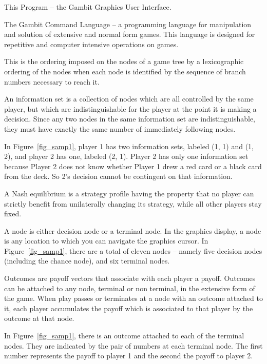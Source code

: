\begin{helpglossary}
\label{guigloss}
This Program -- the Gambit Graphics User Interface.

\label{gclgloss}
The Gambit Command Language -- a programming language for manipulation and
solution of extensive and normal form games.  This language is designed
for repetitive and computer intensive operations on games.  

\label{indextravgloss}
This is the ordering imposed on the nodes of a game tree by a lexicographic 
ordering of the nodes when each node is identified by the sequence of branch 
numbers necessary to reach it.  

\label{infosetgloss}
An information set is a collection of nodes which are all controlled by
the same player, but which are indistinguishable 
for the player at the point it is making a decision.  Since any two nodes 
in the same information set are indistinguishable, they must have exactly 
the same number of immediately following nodes. 

In Figure~\ref{fig_samp1}, player 1 has two information
sets, labeled (1, 1) and (1, 2), and player 2 has one, labeled (2, 1).
Player 2 has only one information set because Player 2 does not know whether
 Player 1 drew a red card or a black card from the deck.  So 2's decision 
cannot be contingent on that information.

\label{nashequigloss}
A Nash equilibrium is a strategy profile having the property that no player 
can strictly benefit from unilaterally changing its strategy, while all 
other players stay fixed.  

\label{nodegloss}
A node is either decision node or a terminal node.  In the graphics 
display, a node is any location to which you can navigate the graphics 
cursor. In Figure~\ref{fig_samp1}, there are a total of eleven nodes -- namely 
five decision nodes (including the chance node), and six terminal nodes.  

\label{outcomegloss}
Outcomes are payoff vectors that associate with each player a payoff.  
Outcomes can be attached to any node, terminal or non terminal, in the 
extensive form of the game.  When play passes or terminates at a node 
with an outcome attached to it, each player accumulates the payoff which 
is associated to that player by the outcome at that node. 

In Figure~\ref{fig_samp1}, there is an outcome attached to each of the
terminal nodes.  They are indicated by the pair of numbers at each
terminal node.  The first number represents the payoff to player 1 and the
second the payoff to player 2.


\end{helpglossary}
